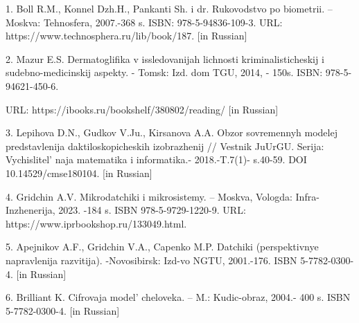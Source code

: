 \begin{references}
1. Boll R.M., Konnel Dzh.H., Pankanti Sh. i dr. Rukovodstvo po
biometrii. -- Moskva: Tehnosfera, 2007.-368 s. ISBN: 978-5-94836-109-3.
URL: {https://www.technosphera.ru/lib/book/187}. {[}in Russian{]}

2. Mazur E.S. Dermatoglifika v issledovanijah lichnosti
kriminalisticheskij i sudebno-medicinskij aspekty. - Tomsk: Izd. dom
TGU, 2014, - 150s. ISBN: 978-5-94621-450-6.

URL: {https://ibooks.ru/bookshelf/380802/reading}/ {[}in Russian{]}

3. Lepihova D.N., Gudkov V.Ju., Kirsanova A.A. Obzor sovremennyh modelej
predstavlenija daktiloskopi\-cheskih izobrazhenij // Vestnik JuUrGU.
Serija: Vychislitel' naja matematika i informatika.-
2018.-T.7(1)- s.40-59. DOI 10.14529/cmse180104. {[}in Russian{]}

4. Gridchin A.V. Mikrodatchiki i mikrosistemy. -- Moskva, Vologda:
Infra-Inzhenerija, 2023. -184 s. ISBN 978-5-9729-1220-9. URL:
https://www.iprbookshop.ru/133049.html.

5. Apejnikov A.F., Gridchin V.A., Capenko M.P. Datchiki (perspektivnye
napravlenija razvitija). -Novosib\-irsk: Izd-vo NGTU, 2001.-176. ISBN
5-7782-0300-4. {[}in Russian{]}

6. Brilliant K. Cifrovaja model'{} cheloveka. -- M.:
Kudic-obraz, 2004.- 400 s. ISBN 5-7782-0300-4. {[}in Russian{]}
\end{references}

